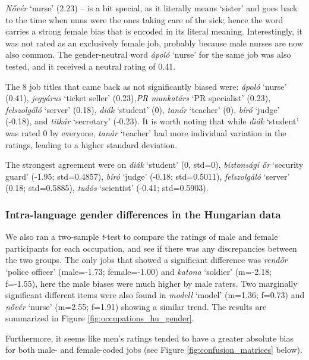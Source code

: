 \documentclass[11pt]{article}
\begin{document}
\textit{Nővér} `nurse' (2.23) -- is a bit special, as it literally means `sister' and goes back to the time when nuns were the ones taking care of the sick; hence the word carries a strong female bias that is encoded in its literal meaning. Interestingly, it was not rated as an exclusively female job, probably because male nurses are now also common. The gender-neutral word \textit{ápoló} `nurse' for the same job was also tested, and it received a neutral rating of 0.41.

The 8 job titles that came back as not significantly biased were: \textit{ápoló} `nurse' (0.41), \textit{jegyárus} `ticket seller' (0.23),\textit{PR munkatárs} `PR specialist' (0.23), \textit{felszolgáló} `server' (0.18),  \textit{diák} `student' (0), \textit{tanár} `teacher' (0), \textit{bíró} `judge' (-0.18), and \textit{titkár} `secretary' (-0.23). It is worth noting that while \textit{diák} `student' was rated 0 by everyone, \textit{tanár} `teacher' had more individual variation in the ratings, leading to a higher standard deviation.

The strongest agreement were on \textit{diák} `student' (0, std=0), \textit{biztonsági őr} `security guard' (-1.95; std=0.4857), \textit{bíró} `judge' (-0.18; std=0.5011), \textit{felszolgáló} `server' (0.18; std=0.5885), \textit{tudós} `scientist' (-0.41; std=0.5903).




\subsubsection{Intra-language gender differences in the Hungarian data}

We also ran a two-sample \textit{t}-test to compare the ratings of male and female participants for each occupation, and see if there was any discrepancies between the two groups. The only jobs that showed a significant difference was \textit{rendőr} `police officer' (male=-1.73; female=-1.00) and \textit{katona} `soldier' (m=-2.18; f=-1.55), here the male biases were much higher by male raters. Two marginally significant different items were also found in \textit{modell} `model' (m=1.36; f=0.73) and \textit{nővér} `nurse' (m=2.55; f=1.91) showing a similar trend. The results are summarized in Figure \ref{fig:occupations_hu_gender}.

Furthermore, it seems like men's ratings tended to have a greater absolute bias for both male- and female-coded jobs (see Figure \ref{fig:confusion_matrices} below).
\end{document}
